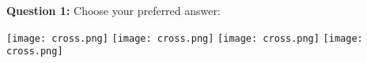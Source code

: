 \documentclass{article}
\begin{document}
\textbf{Question 1:} Choose your preferred answer:

\texttt{[image: cross.png]} \hfill
\texttt{[image: cross.png]} \hfill
\texttt{[image: cross.png]} \hfill
\texttt{[image: cross.png]}
\end{document}
